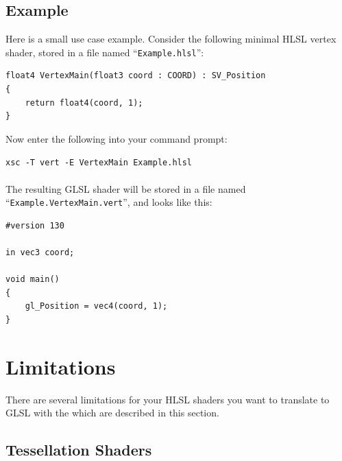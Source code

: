 \documentclass{article}
\begin{document}
\subsection{Example}

Here is a small use case example. Consider the following minimal HLSL vertex shader,
stored in a file named ``\texttt{Example.hlsl}'':
\begin{lstlisting}
float4 VertexMain(float3 coord : COORD) : SV_Position
{
    return float4(coord, 1);
}
\end{lstlisting}
Now enter the following into your command prompt:

\texttt{xsc -T vert -E VertexMain Example.hlsl}
\\ \\
\noindent
The resulting GLSL shader will be stored in a file named ``\texttt{Example.VertexMain.vert}'', and looks like this:
\begin{lstlisting}
#version 130

in vec3 coord;

void main()
{
    gl_Position = vec4(coord, 1);
}
\end{lstlisting}









\newpage
\section{Limitations}

There are several limitations for your HLSL shaders you want to translate to GLSL with the \XSC
which are described in this section.

\subsection{Tessellation Shaders}
\end{document}
